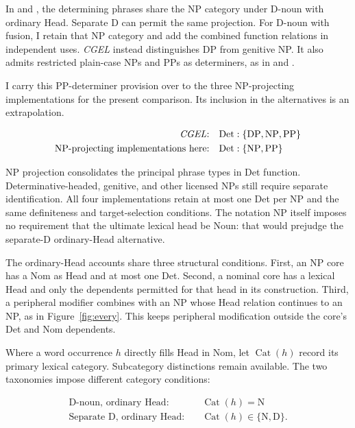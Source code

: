 \documentclass[12pt]{article}
\begin{document}
In  and , the determining phrases share the NP category under D-noun with ordinary Head. Separate D can permit the same projection. For D-noun with fusion, I retain that NP category and add the combined function relations in independent uses. \textit{CGEL} instead distinguishes DP from genitive NP. It also admits restricted plain-case NPs and PPs as determiners, as in  and  \citep[Ch.~5, §4]{huddleston2002}.

I carry this PP-determiner provision over to the three NP-projecting implementations for the present comparison. Its inclusion in the alternatives is an extrapolation.

\[
\begin{aligned}
\text{\textit{CGEL}:} &\quad \mathrm{Det}:\{\mathrm{DP},\mathrm{NP},\mathrm{PP}\} \\
\text{NP-projecting implementations here:} &\quad \mathrm{Det}:\{\mathrm{NP},\mathrm{PP}\}
\end{aligned}
\]

NP projection consolidates the principal phrase types in Det function. Determinative-headed, genitive, and other licensed NPs still require separate identification. All four implementations retain at most one Det per NP and the same definiteness and target-selection conditions. The notation NP itself imposes no requirement that the ultimate lexical head be Noun: that would prejudge the separate-D ordinary-Head alternative.

The ordinary-Head accounts share three structural conditions. First, an NP core has a Nom as Head and at most one Det. Second, a nominal core has a lexical Head and only the dependents permitted for that head in its construction. Third, a peripheral modifier combines with an NP whose Head relation continues to an NP, as in Figure~\ref{fig:every}. This keeps peripheral modification outside the core's Det and Nom dependents.

Where a word occurrence $h$ directly fills Head in Nom, let $\operatorname{Cat}(h)$ record its primary lexical category. Subcategory distinctions remain available. The two taxonomies impose different category conditions:

\[
\begin{aligned}
\text{D-noun, ordinary Head:} &\quad \operatorname{Cat}(h)=\mathrm{N} \\
\text{Separate D, ordinary Head:} &\quad \operatorname{Cat}(h)\in\{\mathrm{N},\mathrm{D}\}.
\end{aligned}
\]
\end{document}
